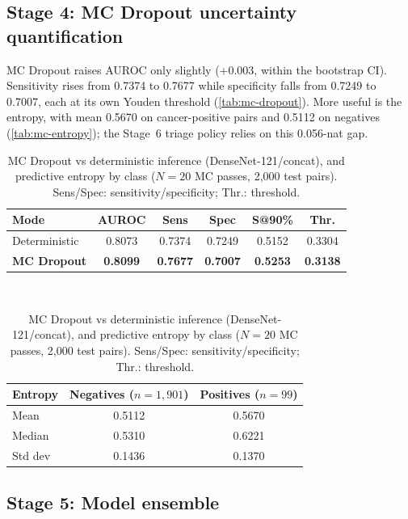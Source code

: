 \documentclass[conference]{IEEEtran}
\begin{document}
\subsection{Stage 4: MC Dropout uncertainty quantification}

MC Dropout raises AUROC only slightly (+0.003, within the bootstrap CI). Sensitivity rises from 0.7374 to 0.7677 while specificity falls from 0.7249 to 0.7007, each at its own Youden threshold (\autoref{tab:mc-dropout}). More useful is the entropy, with mean 0.5670 on cancer-positive pairs and 0.5112 on negatives (\autoref{tab:mc-entropy}); the Stage~6 triage policy relies on this 0.056-nat gap.

\begin{table}[!t]
\centering
\caption{MC Dropout vs deterministic inference (DenseNet-121/concat), and predictive entropy by class ($N=20$ MC passes, 2,000 test pairs). Sens/Spec: sensitivity/specificity; Thr.: threshold.}
\label{tab:mc-dropout}\label{tab:mc-entropy}
{\footnotesize\setlength{\tabcolsep}{3pt}%
\begin{tabular}{|p{1.9cm}|c|c|c|c|c|}
\hline
\textbf{Mode} & \textbf{AUROC} & \textbf{Sens} & \textbf{Spec} & \textbf{S@90\%} & \textbf{Thr.} \\
\hline
Deterministic & 0.8073 & 0.7374 & 0.7249 & 0.5152 & 0.3304 \\
\hline
\textbf{MC Dropout} & \textbf{0.8099} & \textbf{0.7677} & \textbf{0.7007} & \textbf{0.5253} & \textbf{0.3138} \\
\hline
\end{tabular}\\[6pt]
\begin{tabular}{|l|c|c|}
\hline
\textbf{Entropy} & \textbf{Negatives ($n=1{,}901$)} & \textbf{Positives ($n=99$)} \\
\hline
Mean    & 0.5112 & 0.5670 \\
\hline
Median  & 0.5310 & 0.6221 \\
\hline
Std dev & 0.1436 & 0.1370 \\
\hline
\end{tabular}}
\par\vspace{3pt}{\raggedright\footnotesize Gap: $+$0.056 nats. Higher entropy $\Rightarrow$ refer high-uncertainty cases.\par}
\end{table}

\subsection{Stage 5: Model ensemble}\label{sec:ens-results}
\end{document}
